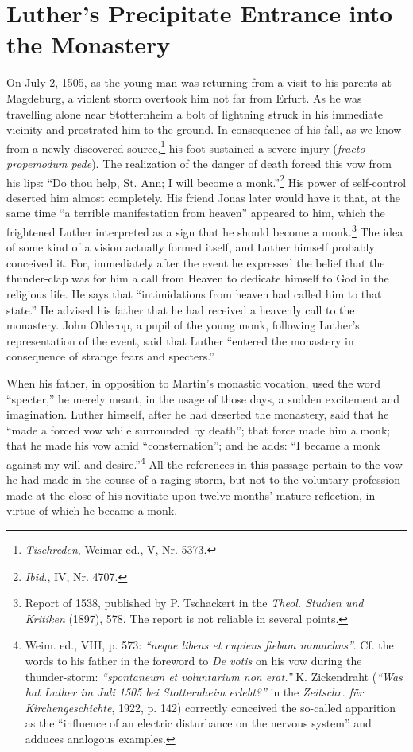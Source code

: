 \section{Luther's Precipitate Entrance into the Monastery}

On July 2, 1505, as the young man was returning from a visit
to his parents at Magdeburg, a violent storm overtook him not far
from Erfurt. As he was travelling alone near Stotternheim a bolt
of lightning struck in his immediate vicinity and prostrated him
to the ground. In consequence of his fall, as we know from a newly
discovered source,\footnote{\textit{Tischreden}, Weimar ed., V, Nr. 5373.}
his foot sustained a severe injury (\textit{fracto propemodum pede}).
The realization of the danger of death forced this vow
from his lips: “Do thou help, St. Ann; I will become a monk.”\footnote{\textit{Ibid.}, IV, Nr. 4707.}
His power of self-control deserted him almost completely. His friend
Jonas later would have it that, at the same time “a terrible manifestation
from heaven” appeared to him, which the frightened Luther interpreted
as a sign that he should become a monk.\footnote
{Report of 1538, published by P. Tschackert in the \textit{Theol. Studien und Kritiken}
(1897), 578. The report is not reliable in several points.}
The idea of some
kind of a vision actually formed itself, and Luther himself probably
conceived it. For, immediately after the event he expressed the belief
that the thunder-clap was for him a call from Heaven to dedicate
himself to God in the religious life. He says that “intimidations from
heaven had called him to that state.” He advised his father that he had
received a heavenly call to the monastery. John Oldecop, a pupil of
the young monk, following Luther’s representation of the event, said
that Luther “entered the monastery in consequence of strange fears
and specters.”

When his father, in opposition to Martin’s monastic vocation, used
the word “specter,” he merely meant, in the usage of those days, a
sudden excitement and imagination. Luther himself, after he had
deserted the monastery, said that he “made a forced vow while surrounded
by death”; that force made him a monk; that he made
his vow amid “consternation”; and he adds: “I became a monk
against my will and desire.”\footnote
{Weim. ed., VIII, p. 573: \textit{“neque libens et cupiens fiebam monachus”}. Cf. the words
to his father in the foreword to \textit{De votis} on his vow during the thunder-storm:
\textit{``spontaneum et voluntarium non erat.''} K. Zickendraht (\textit{``Was hat Luther im Juli 1505 bei
Stotternheim erlebt?''} in the \textit{Zeitschr. für Kirchengeschichte}, 1922, p. 142) correctly conceived
the so-called apparition as the “influence of an electric disturbance on the nervous
system” and adduces analogous examples.}
All the references in this passage pertain
to the vow he had made in the course of a raging storm, but
not to the voluntary profession made at the close of his novitiate upon
twelve months’ mature reflection, in virtue of which he became a monk.

